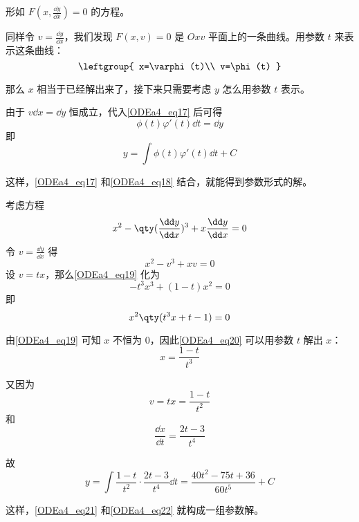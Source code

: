 形如 $F(x, \frac{\dd y}{\dd x})=0$ 的方程。

同样令 $v=\frac{\dd y}{\dd x}$，我们发现 $F(x, v)=0$ 是 $Oxv$ 平面上的一条曲线。用参数 $t$ 来表示这条曲线：
\begin{equation}\label{ODEa4_eq17}
\leftgroup{
    x=\varphi(t)\\
    v=\phi(t)
}
\end{equation}

那么 $x$ 相当于已经解出来了，接下来只需要考虑 $y$ 怎么用参数 $t$ 表示。

由于 $v\dd x=\dd y$ 恒成立，代入\autoref{ODEa4_eq17} 后可得
\begin{equation}
\phi(t)\varphi'(t)\dd t=\dd y
\end{equation}
即
\begin{equation}\label{ODEa4_eq18}
y=\int \phi(t)\varphi'(t)\dd t+C
\end{equation}

这样，\autoref{ODEa4_eq17} 和\autoref{ODEa4_eq18} 结合，就能得到参数形式的解。

\begin{example}{}
考虑方程
\begin{equation}
x^2-\qty(\frac{\dd y}{\dd x})^3+x\frac{\dd y}{\dd x}=0
\end{equation}
令 $v=\frac{\dd y}{\dd x}$ 得
\begin{equation}\label{ODEa4_eq19}
x^2-v^3+xv=0
\end{equation}
设 $v=tx$，那么\autoref{ODEa4_eq19} 化为
\begin{equation}
-t^3x^3+(1-t)x^2=0
\end{equation}
即
\begin{equation}\label{ODEa4_eq20}
x^2\qty(t^3x+t-1)=0
\end{equation}

由\autoref{ODEa4_eq19} 可知 $x$ 不恒为 $0$，因此\autoref{ODEa4_eq20} 可以用参数 $t$ 解出 $x$：
\begin{equation}\label{ODEa4_eq21}
x=\frac{1-t}{t^3}
\end{equation}

又因为
\begin{equation}
v=tx=\frac{1-t}{t^2}
\end{equation}
和
\begin{equation}
\frac{\dd x}{\dd t}=\frac{2t-3}{t^4}
\end{equation}

故
\begin{equation}\label{ODEa4_eq22}
y=\int \frac{1-t}{t^2}\cdot\frac{2t-3}{t^4}\dd t=\frac{40t^2-75t+36}{60t^5}+C
\end{equation}

这样，\autoref{ODEa4_eq21} 和\autoref{ODEa4_eq22} 就构成一组参数解。



\end{example}



